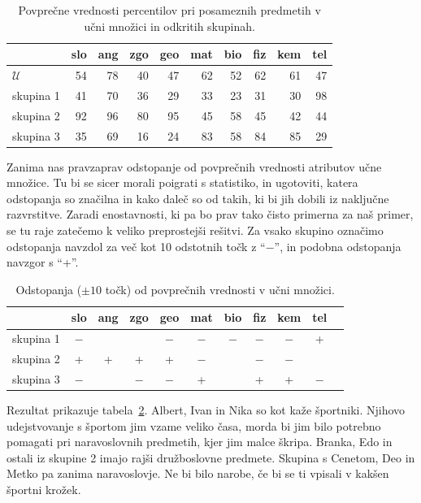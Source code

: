 \begin{table}[htbp]
\caption{Povprečne vrednosti percentilov pri posameznih predmetih v
  učni množici in odkritih skupinah.}
\label{f-povp-skupin}
\begin{center}
\begin{tabular}{lrrrrrrrrr}
\toprule
 & slo & ang & zgo & geo & mat & bio & fiz & kem & tel \\
\midrule
$\mathcal{U}$ & 54 & 78 & 40 & 47 & 62 & 52 & 62 & 61 & 47 \\
skupina 1 & 41 & 70 & 36 & 29 & 33 & 23 & 31 & 30 & 98 \\
skupina 2 & 92 & 96 & 80 & 95 & 45 & 58 & 45 & 42 & 44 \\
skupina 3 & 35 & 69 & 16 & 24 & 83 & 58 & 84 & 85 & 29 \\
\bottomrule
\end{tabular}
\end{center}
\end{table}

Zanima nas pravzaprav odstopanje od povprečnih vrednosti atributov
učne množice. Tu bi se sicer morali poigrati s statistiko, in
ugotoviti, katera odstopanja so značilna in kako daleč so od takih, ki
bi jih dobili iz naključne razvrstitve. Zaradi enostavnosti, ki pa bo
prav tako čisto primerna za naš primer, se tu raje zatečemo
k veliko preprostejši rešitvi. Za vsako skupino označimo odstopanja
navzdol za več kot 10 odstotnih točk z ``$-$'', in podobna odstopanja
navzgor s ``+''. 

\begin{table}[htbp]
\caption{Odstopanja ($\pm 10$ točk) od povprečnih vrednosti v učni množici.}
\label{f-odstopanja-skupin}
\begin{center}
\begin{tabular}{lcccccccccc}
\toprule
 & slo & ang & zgo & geo & mat & bio & fiz & kem & tel \\
\midrule
skupina 1 & $-$ &  &  & $-$ & $-$ & $-$ & $-$ & $-$ & + \\
skupina 2 & + & + & + & + & $-$ &  & $-$ & $-$ &  \\
skupina 3 & $-$ &  & $-$ & $-$ & + &  & + & + & $-$ \\
\bottomrule
\end{tabular}
\end{center}
\end{table}

Rezultat prikazuje tabela~\ref{f-odstopanja-skupin}. Albert, Ivan in
Nika so kot kaže športniki. Njihovo udejstvovanje s športom jim vzame
veliko časa, morda bi jim bilo potrebno pomagati pri naravoslovnih
predmetih, kjer jim malce škripa. Branka, Edo in ostali iz skupine 2
imajo rajši družboslovne predmete. Skupina s Cenetom, Deo in Metko pa
zanima naravoslovje. Ne bi bilo narobe, če bi se ti vpisali v kakšen
športni krožek.


